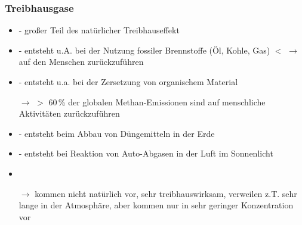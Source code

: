 \begin{frame}
	\frametitle{Treibhausgase}
	\begin{itemize}		
		\item  {\color{red}{Wasserdampf $H_2O$}} -  großer Teil des natürlicher Treibhauseffekt %
		\item  {\color{red}{Kohlenstoffdioxid $CO_2$}} - entsteht u.A. bei der Nutzung fossiler Brennstoffe (Öl, Kohle, Gas) $<$ $\rightarrow$ auf den Menschen zurückzuführen  
		\item  {\color{red}{Methan $CH_4$}} - entsteht u.a. bei der Zersetzung von organischem Material
		\item[$\rightarrow$] $>$ 60\,\% der globalen Methan-Emissionen sind auf menschliche Aktivitäten zurückzuführen %
		\item  {\color{red}{Distickstoffmonoxid $N_2O$ (Lachgas)}} - entsteht beim Abbau von Düngemitteln in der Erde
		\item  {\color{red}{Ozon $O_3$}} - entsteht bei Reaktion von Auto-Abgasen in der Luft im Sonnenlicht
		\item {\color{red}{fluorierte Treibhausgase (F-Gase)}}
		\item[$\rightarrow$] kommen nicht natürlich vor, sehr treibhauswirksam, verweilen z.T. sehr lange in der Atmosphäre, %
		aber kommen nur in sehr geringer Konzentration vor
		
	\end{itemize}
\end{frame}


